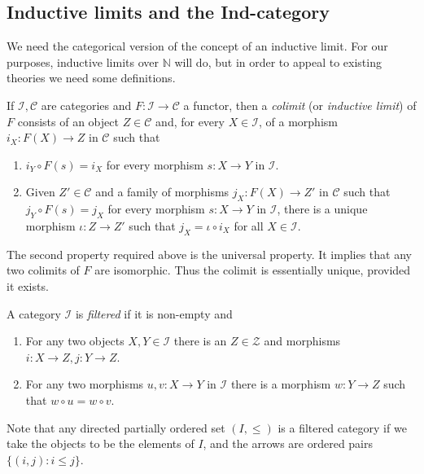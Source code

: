 \documentclass[12pt]{article}
\theoremstyle{definition}
\theoremstyle{definition}
\theoremstyle{remark}
\def\2#1{{\mathcal #1}}
\def\7#1{{\mathbb #1}}
\newcommand{\rarr}{\rightarrow}
\begin{document}


\subsection{Inductive limits and the Ind-category}  \label{ss-ind}
We need the categorical version of the concept of an inductive  limit. For our purposes, inductive
limits over $\7N$ will do, but in order to appeal to existing theories we need some definitions.

\bdefin If $\2I,\2C$ are categories and $F:\2I\rarr\2C$ a functor, then a \emph{colimit} (or 
\emph{inductive limit}) of $F$ consists of an object $Z\in\2C$ and, for every $X\in\2I$, of a
morphism $i_X:F(X)\rarr Z$ in  $\2C$ such that 
\begin{enumerate}
\item $i_Y\circ F(s)=i_X$ for every morphism $s:X\rarr Y$ in $\2I$.
\item Given $Z'\in\2C$ and a family of morphisms $j_X:F(X)\rarr Z'$ in $\2C$ such that 
$j_Y\circ F(s)=j_X$ for every morphism $s:X\rarr Y$ in $\2I$, there is a unique morphism 
$\iota:Z\rarr Z'$ such that $j_X=\iota\circ i_X$ for all $X\in\2I$.
\end{enumerate}
\edefin

The second property required above is the universal property. It implies that any two colimits of
$F$ are isomorphic. Thus the colimit is essentially unique, provided it exists.

\bdefin \label{def-filtered}
A category $\2I$ is \emph{filtered} if it is non-empty and 
\begin{enumerate}
\item For any two objects $X,Y\in\2I$ there is an $Z\in\2Z$ and morphisms $i:X\rarr Z, j:Y\rarr Z$.
\item For any two morphisms $u,v:X\rarr Y$ in $\2I$ there is a morphism $w:Y\rarr Z$ such that
$w\circ u=w\circ v$.
\end{enumerate}
\edefin

Note that any directed partially ordered set $(I,\leq )$ is a filtered category if we take the
objects to be the elements of $I$, and the arrows are ordered pairs $\{ (i,j):i\leq j\}$.
\end{document}
